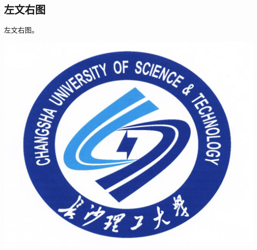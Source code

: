 \documentclass[dvipsnames, svgnames, x11names]{beamer}
\begin{document}
\subsection{左文右图}
\begin{frame}
    \begin{minipage}{.5\linewidth}
        左文右图。
    \end{minipage}
    \quad\quad
    \begin{minipage}{.4\linewidth}
    \includegraphics[width=\linewidth]{../figure/csustlogo_2640by2170.jpg}
    \end{minipage}
\end{frame}
\end{document}

